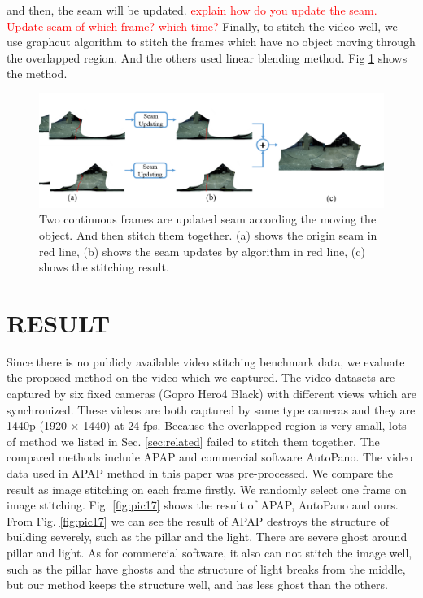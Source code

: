 \documentclass[conference]{IEEEtran}
\begin{document}
and then, the seam will be updated.
\textcolor{red}{explain how do you update the seam. Update seam of which frame? which time? }
%
%
Finally, to stitch the video well, we use graphcut algorithm \cite{boykov2004experimental} to stitch the frames which have no object moving through the overlapped region. 
And the others used linear blending method.
Fig \ref{fig:p24} shows the method.
\begin{figure}[h]
\centering
\includegraphics[scale=0.25]{picture43.png}
\caption{Two continuous frames are updated seam according the moving the object. And then stitch them together. (a) shows the origin seam in red line, (b) shows the seam updates 
by algorithm \cite{he2016parallax} in red line,
(c) shows the stitching result.}
\label{fig:p24}
\end{figure}

\section{RESULT}
\label{sec:result}

Since there is no publicly available video stitching benchmark data, we evaluate the proposed method on the 
video which we captured.  The video datasets are captured by six fixed cameras (Gopro Hero4 Black) with different views which are synchronized. 
These videos are both captured by same type cameras and they are 1440p (1920 $\times$ 1440) at 24 fps.
Because the overlapped region is very small, lots of method we listed in Sec. \ref{sec:related} failed to stitch them together.
The compared methods include APAP and commercial software AutoPano. The video data used in APAP method in this paper was pre-processed. We compare the result as image stitching on each frame firstly.
We randomly select one frame on image stitching. Fig. \ref{fig:pic17} shows the result of APAP, AutoPano and ours. 
From Fig. \ref{fig:pic17} we can see the result of APAP 
destroys the structure of building severely, such as the pillar and the light. There are severe ghost around pillar and light.
As for commercial software, it also can not stitch the image well, such as the pillar have ghosts and the structure of light breaks from the middle, 
but our method keeps the structure well, and has less ghost than the others.
\end{document}
